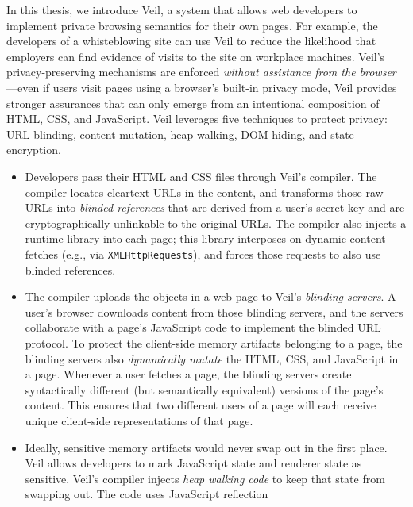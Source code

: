 In this thesis, we introduce Veil, a system
that allows web developers to implement
private browsing semantics for their own pages.
For example, the developers of a whisteblowing
site can use Veil to reduce the likelihood
that employers can find evidence of visits to
the site on workplace machines.
Veil's privacy-preserving mechanisms are
enforced \emph{without assistance from the
browser}---even if users visit pages using
a browser's built-in privacy mode, Veil
provides stronger assurances that
can only emerge from an intentional
composition of HTML, CSS, and JavaScript.
Veil leverages five techniques to protect
privacy: URL blinding, content mutation,
heap walking, DOM hiding, and state encryption.
  \begin{itemize}
    \item Developers pass their HTML and CSS files through
          Veil's compiler. The compiler locates cleartext
          URLs in the content, and transforms those raw
          URLs into \emph{blinded references} that are
          derived from a user's secret key and are
          cryptographically unlinkable to the original
          URLs. The compiler also injects a runtime
          library into each page; this library interposes
          on dynamic content fetches (e.g., via
          \texttt{XMLHttpRequests}), and forces those
          requests to also use blinded references.
    \item The compiler uploads the objects in a web page to
          Veil's \emph{blinding servers}. A user's browser
          downloads content from those blinding servers, and
          the servers collaborate with a page's JavaScript
          code to implement the blinded URL protocol. To
          protect the client-side memory artifacts belonging
          to a page, the blinding servers also \emph{dynamically
          mutate} the HTML, CSS, and JavaScript in a page.
          Whenever a user fetches a page, the blinding servers
          create syntactically different (but semantically
          equivalent) versions of the page's content. This
          ensures that two different users of a page will
          each receive unique client-side representations
          of that page.
    \item Ideally, sensitive memory artifacts would never
          swap out in the first place. Veil allows developers
          to mark JavaScript state and renderer state as
          sensitive. Veil's compiler injects \emph{heap
          walking code} to keep that state from swapping out.
          The code uses JavaScript reflection

\end{itemize}
